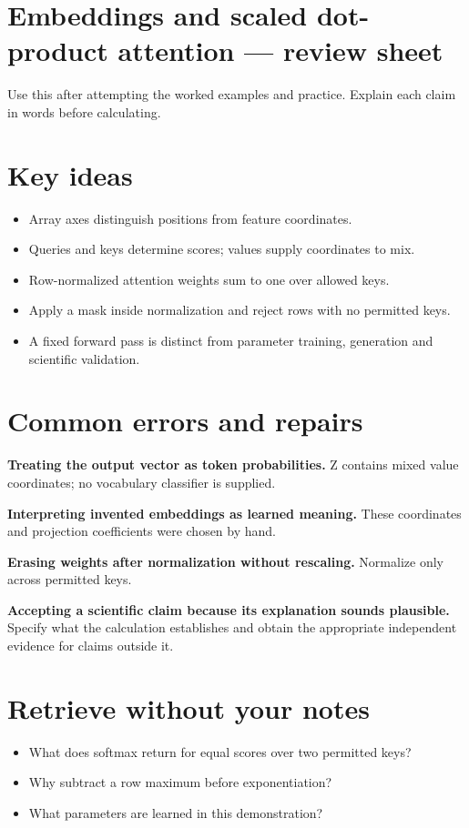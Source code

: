 \documentclass[11pt,letterpaper]{article}
\theoremstyle{definition}\newtheorem{definition}{Definition}\newtheorem{example}{Example}
\numberwithin{equation}{section}
\begin{document}
\section*{Embeddings and scaled dot-product attention --- review sheet}
Use this after attempting the worked examples and practice. Explain each claim in words before calculating.

\section*{Key ideas}
\begin{itemize}
\item Array axes distinguish positions from feature coordinates.
\item Queries and keys determine scores; values supply coordinates to mix.
\item Row-normalized attention weights sum to one over allowed keys.
\item Apply a mask inside normalization and reject rows with no permitted keys.
\item A fixed forward pass is distinct from parameter training, generation and scientific validation.
\end{itemize}
\section*{Common errors and repairs}
\textbf{Treating the output vector as token probabilities.} Z contains mixed value coordinates; no vocabulary classifier is supplied.

\textbf{Interpreting invented embeddings as learned meaning.} These coordinates and projection coefficients were chosen by hand.

\textbf{Erasing weights after normalization without rescaling.} Normalize only across permitted keys.

\textbf{Accepting a scientific claim because its explanation sounds plausible.} Specify what the calculation establishes and obtain the appropriate independent evidence for claims outside it.

\section*{Retrieve without your notes}
\begin{itemize}
\item What does softmax return for equal scores over two permitted keys?
\item Why subtract a row maximum before exponentiation?
\item What parameters are learned in this demonstration?
\end{itemize}
\end{document}
